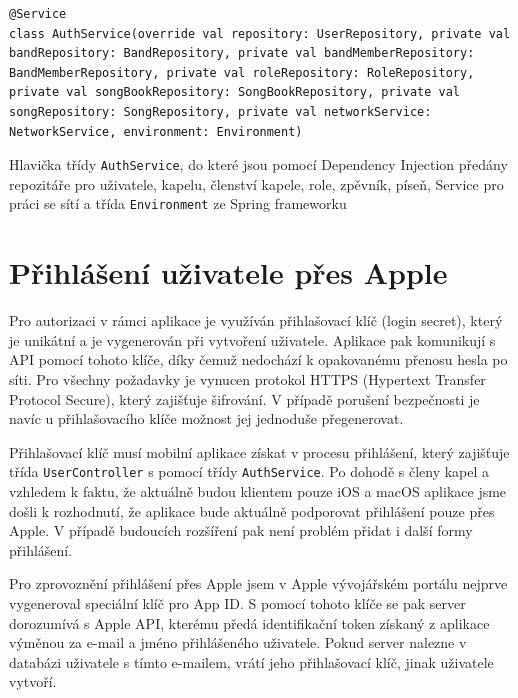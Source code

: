\begin{listing}[H]
\begin{verbatim}
@Service
class AuthService(override val repository: UserRepository, private val bandRepository: BandRepository, private val bandMemberRepository: BandMemberRepository, private val roleRepository: RoleRepository, private val songBookRepository: SongBookRepository, private val songRepository: SongRepository, private val networkService: NetworkService, environment: Environment)
\end{verbatim}
\caption[Ukázka hlavičky třídy Service pro přihlášení]{Hlavička třídy \texttt{AuthService}, do které jsou pomocí Dependency Injection předány repozitáře pro uživatele, kapelu, členství kapele, role, zpěvník, píseň, Service pro práci se sítí a třída \texttt{Environment} ze Spring frameworku}
\end{listing}

\section{Přihlášení uživatele přes Apple}

Pro autorizaci v rámci aplikace je využíván přihlašovací klíč (login secret), který je unikátní a je vygenerován při vytvoření uživatele. Aplikace pak komunikují s API pomocí tohoto klíče, díky čemuž nedochází k opakovanému přenosu hesla po síti. Pro všechny požadavky je vynucen protokol HTTPS (Hypertext Transfer Protocol Secure), který zajišťuje šifrování. V případě porušení bezpečnosti je navíc u přihlašovacího klíče možnost jej jednoduše přegenerovat.

Přihlašovací klíč musí mobilní aplikace získat v procesu přihlášení, který zajišťuje třída \texttt{UserController} s pomocí třídy \texttt{AuthService}. Po dohodě s členy kapel a vzhledem k faktu, že aktuálně budou klientem pouze iOS a macOS aplikace jsme došli k rozhodnutí, že aplikace bude aktuálně podporovat přihlášení pouze přes Apple. V případě budoucích rozšíření pak není problém přidat i další formy přihlášení.

Pro zprovoznění přihlášení přes Apple jsem v Apple vývojářském portálu nejprve vygeneroval speciální klíč pro App ID. S pomocí tohoto klíče se pak server dorozumívá s Apple API, kterému předá identifikační token získaný z aplikace výměnou za e-mail a jméno přihlášeného uživatele. Pokud server nalezne v databázi uživatele s tímto e-mailem, vrátí jeho přihlašovací klíč, jinak uživatele vytvoří.

